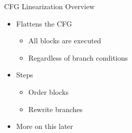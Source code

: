 \begin{frame}{CFG Linearization Overview}

\begin{minipage}[t]{0.45\linewidth}

\begin{itemize}
    \item Flattens the CFG
    \begin{itemize}
        \item All blocks are executed
        \item Regardless of branch conditions
    \end{itemize}
    \item Steps
    \begin{itemize}
        \item Order blocks
        \item Rewrite branches
    \end{itemize}
    \item More on this later
\end{itemize}

\end{minipage}
\hspace{1em}
\begin{minipage}[t]{0.43\linewidth}

\vspace{0.1ex}


\end{minipage}

\end{frame}

